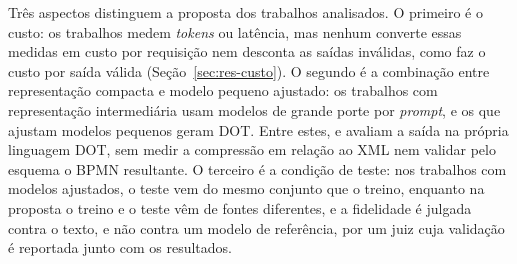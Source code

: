 Três aspectos distinguem a proposta dos trabalhos analisados. O primeiro é o custo: os trabalhos medem \textit{tokens} ou latência, mas nenhum converte essas medidas em custo por requisição nem desconta as saídas inválidas, como faz o custo por saída válida (Seção~\ref{sec:res-custo}). O segundo é a combinação entre representação compacta e modelo pequeno ajustado: os trabalhos com representação intermediária usam modelos de grande porte por \textit{prompt}, e os que ajustam modelos pequenos geram DOT. Entre estes,  e  avaliam a saída na própria linguagem DOT, sem medir a compressão em relação ao XML nem validar pelo esquema o BPMN resultante. O terceiro é a condição de teste: nos trabalhos com modelos ajustados, o teste vem do mesmo conjunto que o treino, enquanto na proposta o treino e o teste vêm de fontes diferentes, e a fidelidade é julgada contra o texto, e não contra um modelo de referência, por um juiz cuja validação é reportada junto com os resultados.
